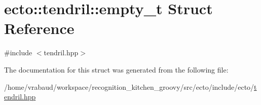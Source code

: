 \hypertarget{structecto_1_1tendril_1_1empty__t}{\section{ecto\-:\-:tendril\-:\-:empty\-\_\-t \-Struct \-Reference}
\label{structecto_1_1tendril_1_1empty__t}
}


{\ttfamily \#include $<$tendril.\-hpp$>$}



\-The documentation for this struct was generated from the following file\-:\begin{DoxyCompactItemize}
\item 
/home/vrabaud/workspace/recognition\-\_\-kitchen\-\_\-groovy/src/ecto/include/ecto/\hyperlink{tendril_8hpp}{tendril.\-hpp}\end{DoxyCompactItemize}
